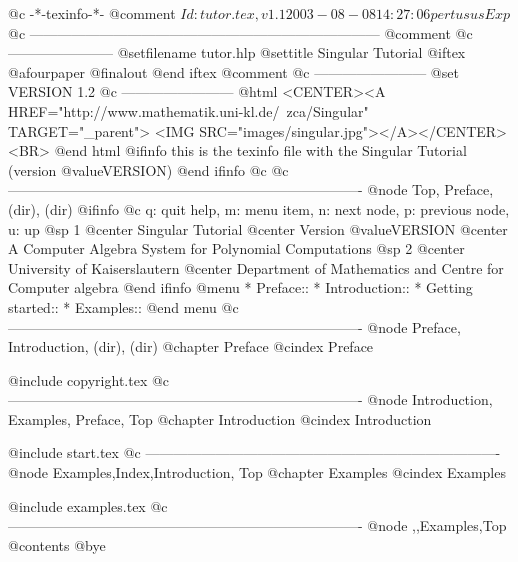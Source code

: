     @c -*-texinfo-*-
@comment $Id: tutor.tex,v 1.1 2003-08-08 14:27:06 pertusus Exp $
@c ---------------------------------------------------------------------------
@comment %
@c -----------------------
@setfilename tutor.hlp
@settitle Singular Tutorial
@iftex
@afourpaper
@finalout
@end iftex
@comment %
@c ------------------------
@set VERSION 1.2
@c ------------------------
@html
<CENTER><A HREF="http://www.mathematik.uni-kl.de/~zca/Singular" TARGET="_parent">
<IMG SRC="images/singular.jpg"></A></CENTER><BR>
@end html
@ifinfo
this is the texinfo file with the Singular Tutorial (version @value{VERSION})
@end ifinfo
@c
@c ----------------------------------------------------------------------------
@node    Top, Preface,    (dir),    (dir)
@ifinfo
@c q: quit help, m: menu item, n: next node, p: previous node, u: up
@sp 1
@center Singular Tutorial
@center Version @value{VERSION}
@center A Computer Algebra System for Polynomial Computations
@sp 2
@center University of Kaiserslautern
@center Department of Mathematics and Centre for Computer algebra
@end ifinfo
@menu
* Preface::
* Introduction::
* Getting started::
* Examples::
@end menu
@c ----------------------------------------------------------------------------
@node Preface, Introduction, (dir),  (dir)
@chapter Preface
@cindex Preface

@include copyright.tex
@c ----------------------------------------------------------------------------
@node Introduction, Examples, Preface, Top
@chapter Introduction
@cindex Introduction

@include start.tex
@c ----------------------------------------------------------------------------
@node Examples,Index,Introduction, Top
@chapter Examples
@cindex Examples

@include examples.tex
@c ----------------------------------------------------------------------------
@node ,,Examples,Top
@contents
@bye

